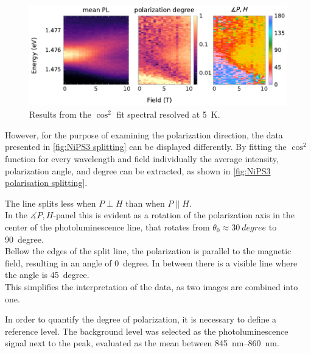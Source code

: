 \documentclass[
	oneside,
	parskip=half,
	a4paper,
]{scrbook}
\begin{document}
\begin{figure}
	\centering
	\includegraphics{../figures/2024-04-09 NiPS3 polarisation Splitting.pdf}
	\caption{Results from the $\cos^2$ fit spectral resolved at \SI{5}{K}.}
	\label{fig:NiPS3 polarisation splitting}
\end{figure}
However, for the purpose of examining the polarization direction, the data presented in \autoref{fig:NiPS3 splitting} can be displayed differently.
By fitting the $\cos^2$ function for every wavelength and field individually the average intensity, polarization angle, and degree can be extracted, as shown in \autoref{fig:NiPS3 polarisation splitting}.

The line splits less when $P\perp H$ than when $P\parallel H$.\\
In the $\measuredangle P, H$-panel this is evident as a rotation of the polarization axis in the center of the photoluminescence line, that rotates from $\theta_0\approx \SI{30}{degree}$ to \SI{90}{degree}.\\
Bellow the edges of the split line, the polarization is parallel to the magnetic field, resulting in an angle of \SI{0}{degree}.
In between there is a visible line where the angle is \SI{45}{degree}.\\
This simplifies the interpretation of the data, as two images are combined into one.

In order to quantify the degree of polarization, it is necessary to define a reference level.
The background level was selected as the photoluminescence signal next to the peak, evaluated as the mean between \SIrange{845}{860}{nm}.

\end{document}
